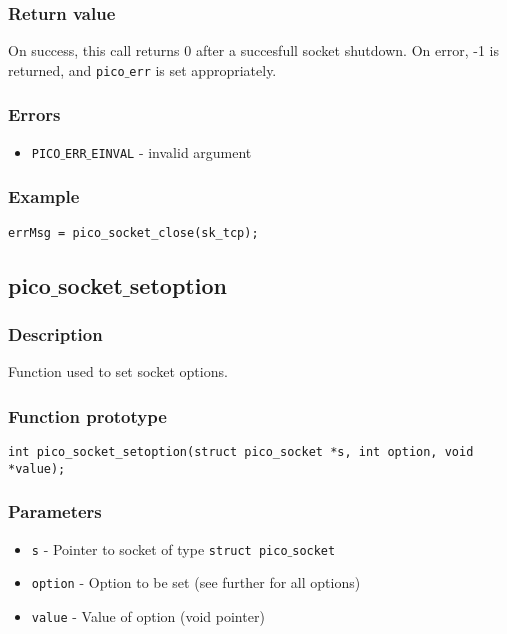\subsubsection*{Return value}
On success, this call returns 0 after a succesfull socket shutdown.
On error, -1 is returned, and \texttt{pico$\_$err} is set appropriately.

\subsubsection*{Errors}
\begin{itemize}[noitemsep]
\item \texttt{PICO$\_$ERR$\_$EINVAL} - invalid argument
\end{itemize}

\subsubsection*{Example}
\begin{verbatim}
errMsg = pico_socket_close(sk_tcp);
\end{verbatim}



\subsection{pico$\_$socket$\_$setoption}

\subsubsection*{Description}
Function used to set socket options.

\subsubsection*{Function prototype}
\begin{verbatim}
int pico_socket_setoption(struct pico_socket *s, int option, void *value);
\end{verbatim}

\subsubsection*{Parameters}
\begin{itemize}[noitemsep]
\item \texttt{s} - Pointer to socket of type \texttt{struct pico$\_$socket}
\item \texttt{option} - Option to be set (see further for all options)
\item \texttt{value} - Value of option (void pointer)
\end{itemize}

